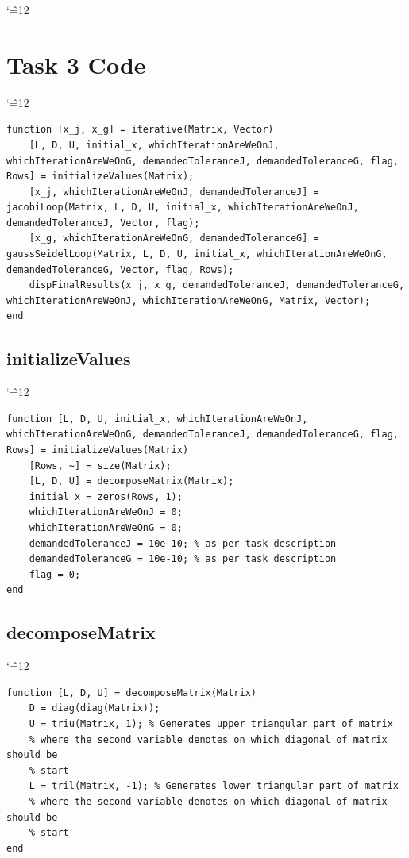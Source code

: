 \documentclass[12pt]{report}
\newenvironment{simplechar}{%
   \catcode`\^=12
}{}
\begin{document}
\begin{simplechar}
\section{Task 3 Code}
\begin{simplechar}
\begin{lstlisting}
function [x_j, x_g] = iterative(Matrix, Vector)
    [L, D, U, initial_x, whichIterationAreWeOnJ, whichIterationAreWeOnG, demandedToleranceJ, demandedToleranceG, flag, Rows] = initializeValues(Matrix);
    [x_j, whichIterationAreWeOnJ, demandedToleranceJ] = jacobiLoop(Matrix, L, D, U, initial_x, whichIterationAreWeOnJ, demandedToleranceJ, Vector, flag);
    [x_g, whichIterationAreWeOnG, demandedToleranceG] = gaussSeidelLoop(Matrix, L, D, U, initial_x, whichIterationAreWeOnG, demandedToleranceG, Vector, flag, Rows);
    dispFinalResults(x_j, x_g, demandedToleranceJ, demandedToleranceG, whichIterationAreWeOnJ, whichIterationAreWeOnG, Matrix, Vector);
end

\end{lstlisting}
\end{simplechar}

\newpage
\subsection{initializeValues}
\begin{simplechar}
\begin{lstlisting}
function [L, D, U, initial_x, whichIterationAreWeOnJ, whichIterationAreWeOnG, demandedToleranceJ, demandedToleranceG, flag, Rows] = initializeValues(Matrix)
    [Rows, ~] = size(Matrix);
    [L, D, U] = decomposeMatrix(Matrix);
    initial_x = zeros(Rows, 1);
    whichIterationAreWeOnJ = 0;
    whichIterationAreWeOnG = 0;
    demandedToleranceJ = 10e-10; % as per task description
    demandedToleranceG = 10e-10; % as per task description
    flag = 0;
end
\end{lstlisting}
\end{simplechar}

\subsection{decomposeMatrix}
\begin{simplechar}
\begin{lstlisting}
function [L, D, U] = decomposeMatrix(Matrix)
    D = diag(diag(Matrix));
    U = triu(Matrix, 1); % Generates upper triangular part of matrix
    % where the second variable denotes on which diagonal of matrix should be
    % start
    L = tril(Matrix, -1); % Generates lower triangular part of matrix
    % where the second variable denotes on which diagonal of matrix should be
    % start
end
\end{lstlisting}
\end{simplechar}


\end{simplechar}
\end{document}
